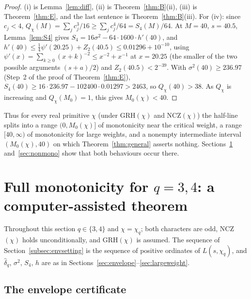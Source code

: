 \documentclass[11pt]{amsart}
\theoremstyle{definition}
\numberwithin{equation}{section}
\newcommand{\hd}{\widehat\delta}
\begin{document}
\begin{proof}
(i) is Lemma~\ref{lem:diff}, (ii) is Theorem~\ref{thm:B}(ii), (iii) is
Theorem~\ref{thm:E}, and the last sentence is
Theorem~\ref{thm:B}(iii). For (iv): since $c_j<4$,
$Q_\chi(M)=\sum_jc_j^3/16\ge\sum_jc_j^4/64=S_4(M)/64$. At $M=40$,
$s=40.5$, Lemma~\ref{lem:S4} gives
$S_4=16\sigma^2-64\cdot1600\cdot h'(40)$, and
$h'(40)\le\frac14\psi'(20.25)+Z_2(40.5)\le0.01296+10^{-10}$, using
$\psi'(x)=\sum_{k\ge0}(x+k)^{-2}\le x^{-2}+x^{-1}$ at $x=20.25$ (the
smaller of the two possible arguments $(s+a)/2$) and
$Z_2(40.5)<2^{-39}$. With $\sigma^2(40)\ge236.97$ (Step~2 of the proof
of Theorem~\ref{thm:E}),
$S_4(40)\ge16\cdot236.97-102400\cdot0.01297>2463$, so
$Q_\chi(40)>38$. As $Q_\chi$ is increasing and $Q_\chi(M_0)=1$, this
gives $M_0(\chi)<40$.
\end{proof}

Thus for every real primitive $\chi$ (under GRH$(\chi)$ and
NCZ$(\chi)$) the half-line splits into a range $(0,M_0(\chi)]$ of
monotonicity near the critical weight, a range $[40,\infty)$ of
monotonicity for large weights, and a nonempty intermediate interval
$(M_0(\chi),40)$ on which Theorem~\ref{thm:general} asserts nothing.
Sections~\ref{sec:main} and~\ref{sec:nonmono} show that both
behaviours occur there.

\section{Full monotonicity for \texorpdfstring{$q=3,4$}{q=3,4}: a
computer-assisted theorem}\label{sec:main}

Throughout this section $q\in\{3,4\}$ and $\chi=\chi_q$; both
characters are odd, NCZ$(\chi)$ holds unconditionally, and
GRH$(\chi)$ is assumed. The sequence of
Section~\ref{subsec:envsetting} is the sequence of positive ordinates
of $L(s,\chi_q)$, and $\hd_q$, $\sigma^2$, $S_4$, $h$ are as in
Sections~\ref{sec:envelope}--\ref{sec:largeweight}.

\subsection{The envelope certificate}\label{subsec:envcert}
\end{document}
